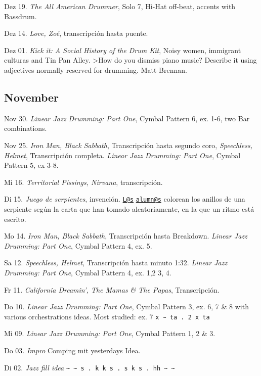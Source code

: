 \documentclass[
]{book}
\begin{document}
Dez 19. \emph{The All American Drummer}, Solo 7, Hi-Hat off-beat, accents with Bassdrum.

Dez 14. \emph{Love, Zoé}, transcripción hasta puente.

Dez 01. \emph{Kick it: A Social History of the Drum Kit}, Noisy women, immigrant culturas and Tin Pan Alley.
\textgreater How do you dismiss piano music? Describe it using adjectives normally reserved for drumming. Matt Brennan.

\hypertarget{november-2022}{%
\subsection*{November}\label{november-2022}}

Nov 30. \emph{Linear Jazz Drumming: Part One}, Cymbal Pattern 6, ex. 1-6, two Bar combinations.

Nov 25. \emph{Iron Man, Black Sabbath}, Transcripción hasta segundo coro, \emph{Speechless, Helmet}, Transcripción completa. \emph{Linear Jazz Drumming: Part One}, Cymbal Pattern 5, ex 3-8.

Mi 16. \emph{Territorial Pissings, Nirvana}, transcripción.

Di 15. \emph{Juego de serpientes}, invención. \href{mailto:L@s}{\nolinkurl{L@s}} \href{mailto:alumn@s}{\nolinkurl{alumn@s}} colorean los anillos de una serpiente según la carta que han tomado aleatoriamente, en la que un ritmo está escrito.

Mo 14. \emph{Iron Man, Black Sabbath}, Transcripción hasta Breakdown. \emph{Linear Jazz Drumming: Part One}, Cymbal Pattern 4, ex. 5.

Sa 12. \emph{Speechless, Helmet}, Transcripción hasta minuto 1:32. \emph{Linear Jazz Drumming: Part One}, Cymbal Pattern 4, ex. 1,2 3, 4.

Fr 11. \emph{California Dreamin', The Mamas \& The Papas}, Transcripción.

Do 10. \emph{Linear Jazz Drumming: Part One}, Cymbal Pattern 3, ex. 6, 7 \& 8 with various orchestrations ideas. Most studied: ex. 7 \texttt{x\ \textasciitilde{}\ ta\ .\ 2\ x\ ta}

Mi 09. \emph{Linear Jazz Drumming: Part One}, Cymbal Pattern 1, 2 \& 3.

Do 03. \emph{Impro} Comping mit yesterdays Idea.

Di 02. \emph{Jazz fill idea} \texttt{\textasciitilde{}\ \textasciitilde{}\ s\ .\ k\ k\ s\ .\ s\ k\ s\ .\ hh\ \textasciitilde{}\ \textasciitilde{}}
\end{document}
